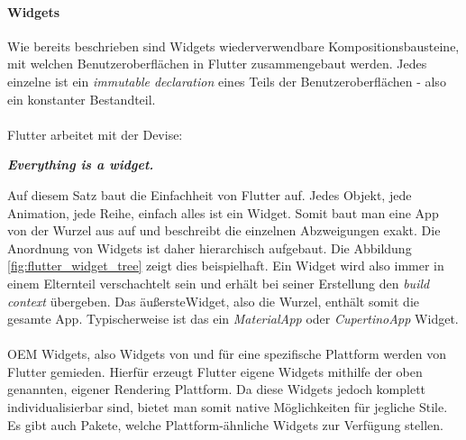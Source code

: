 \paragraph{Widgets}
Wie bereits beschrieben sind Widgets wiederverwendbare Kompositionsbausteine, mit welchen Benutzeroberflächen in Flutter zusammengebaut werden. Jedes einzelne ist ein \textit{immutable declaration} eines Teils der Benutzeroberflächen - also ein konstanter Bestandteil.\\
\\
Flutter arbeitet mit der Devise: 
\begin{displayquote}
	\textbf{\textit{Everything is a widget.}}
\end{displayquote}
Auf diesem Satz baut die Einfachheit von Flutter auf. Jedes Objekt, jede Animation, jede Reihe, einfach alles ist ein Widget. Somit baut man eine App von der Wurzel aus auf und beschreibt die einzelnen Abzweigungen exakt.
Die Anordnung von Widgets ist daher hierarchisch aufgebaut. 
Die Abbildung \ref{fig:flutter_widget_tree} zeigt dies beispielhaft.
Ein Widget wird also immer in einem Elternteil verschachtelt sein und erhält bei seiner Erstellung den \textit{build context} übergeben. Das \glqq äußerste\grqq \space Widget, also die Wurzel, enthält somit die gesamte App. Typischerweise ist das ein \textit{MaterialApp} oder \textit{CupertinoApp} Widget.\\
\\ 
OEM Widgets, also Widgets von und für eine spezifische Plattform werden von Flutter gemieden. Hierfür erzeugt Flutter eigene Widgets mithilfe der oben genannten, eigener Rendering Plattform. Da diese Widgets jedoch komplett individualisierbar sind, bietet man somit native Möglichkeiten für jegliche Stile. Es gibt auch Pakete, welche Plattform-ähnliche Widgets zur Verfügung stellen.

